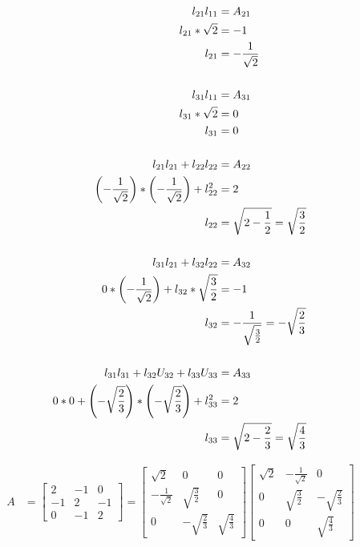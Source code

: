 	\begin{align}
		l_{21}l_{11} &= A_{21}& \notag \\
		l_{21}*\sqrt{2} &= -1& \notag \\
		l_{21} &= -\frac{1}{\sqrt{2}}& \\
		\notag \\
		l_{31}l_{11} &= A_{31}& \notag \\
		l_{31}*\sqrt{2} &= 0& \notag \\
		l_{31}&= 0& \\
		\notag \\		
		l_{21}l_{21} + l_{22}l_{22} &= A_{22}& \notag \\
		\left(-\frac{1}{\sqrt{2}}\right)*\left(-\frac{1}{\sqrt{2}}\right) + l_{22}^{2}  &= 2& \notag \\
		l_{22} &= \sqrt{2 - \frac{1}{2}} = \sqrt{\frac{3}{2}}& \\
		\notag \\
		l_{31}l_{21} + l_{32}l_{22} &= A_{32}& \notag \\
		0*\left(-\frac{1}{\sqrt{2}}\right) + l_{32}*\sqrt{\frac{3}{2}} &= -1& \notag \\
		l_{32} &= -\frac{1}{\sqrt{\frac{3}{2}}} = -\sqrt{\frac{2}{3}}& \\
		\notag \\
		l_{31}l_{31} + l_{32}U_{32} + l_{33}U_{33} &= A_{33}& \notag \\
		0*0 + \left(-\sqrt{\frac{2}{3}}\right)*\left(-\sqrt{\frac{2}{3}}\right) + l_{33}^{2} &= 2& \notag \\
		l_{33} &= \sqrt{2 - \frac{2}{3}} = \sqrt{\frac{4}{3}}&
	\label{eq:53terms}
	\end{align}

	\begin{align}
		A &= \begin{bmatrix}
				2 & -1 & 0 \\[0.3em]
				-1 & 2 & -1 \\[0.3em]
				0 & -1 & 2
			\end{bmatrix}
			=
			\begin{bmatrix}
				\sqrt{2} & 0 & 0 \\[0.3em]
				-\frac{1}{\sqrt{2}} & \sqrt{\frac{3}{2}} & 0 \\[0.3em]
				0 & -\sqrt{\frac{2}{3}} & \sqrt{\frac{4}{3}}
			\end{bmatrix}
			\begin{bmatrix}
				\sqrt{2} & -\frac{1}{\sqrt{2}} & 0 \\[0.3em]
				0 & \sqrt{\frac{3}{2}} & -\sqrt{\frac{2}{3}} \\[0.3em]
				0 & 0 & \sqrt{\frac{4}{3}}
			\end{bmatrix}&
	\label{eq:53cholesky}
	\end{align}

